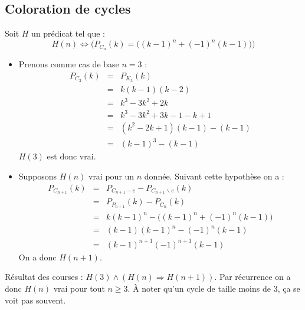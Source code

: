\subsection{Coloration de cycles}
Soit $H$ un prédicat tel que : 
\[ H(n) \Leftrightarrow \Big(P_{C_n}(k) = \big((k-1)^n + (-1)^n(k-1)\big)\Big) \]
\begin{itemize}
\item Prenons comme cas de base $n = 3$ :
\begin{eqnarray*}
P_{C_3}(k) 				& = &	P_{K_3}(k)						\\ 
						& = &	k(k-1)(k-2)						\\
						& = &	k^3 - 3k^2 + 2k					\\
						& = &   k^3 - 3k^2 + 3k - 1 - k + 1 	\\
						& = &	(k^2 -2k + 1)(k-1) - (k-1)		\\
						& = &	(k-1)^3 -(k-1) 					
\end{eqnarray*} $H(3)$ est donc vrai.
\item Supposons $H(n)$ vrai pour un $n$ donnée. Suivant cette hypothèse on a :
\begin{eqnarray*}
P_{C_{n+1}}(k)			& = & P_{C_{n+1}-e} - P_{C_{n+1}\backslash{e}}(k)	\\
						& = & P_{P_{n+1}}(k) - P_{C_n}(k)					\\
						& = & k(k-1)^n - \Big((k-1)^n + (-1)^n(k-1)\Big)	\\
						& = & (k-1)(k-1)^n - (-1)^n(k-1)					\\
						& = & (k-1)^{n+1} (-1)^{n+1}(k-1)					
\end{eqnarray*}
On a donc $H(n+1)$.
\end{itemize}
Résultat des courses : $H(3) \wedge (H(n) \Rightarrow H(n+1))$. Par récurrence on a donc $H(n)$ vrai pour tout $n \geq 3$. À noter qu'un cycle de taille moins de $3$, ça se voit pas souvent.

